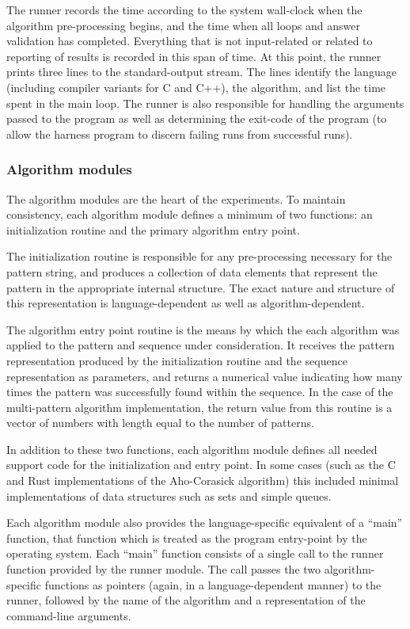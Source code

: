 The runner records the time according to the system wall-clock when the algorithm pre-processing begins, and the time when all loops and answer validation has completed. Everything that is not input-related or related to reporting of results is recorded in this span of time. At this point, the runner prints three lines to the standard-output stream. The lines identify the language (including compiler variants for C and C++), the algorithm, and list the time spent in the main loop. The runner is also responsible for handling the arguments passed to the program as well as determining the exit-code of the program (to allow the harness program to discern failing runs from successful runs).

\subsubsection{Algorithm modules}

The algorithm modules are the heart of the experiments. To maintain consistency, each algorithm module defines a minimum of two functions: an initialization routine and the primary algorithm entry point.

The initialization routine is responsible for any pre-processing necessary for the pattern string, and produces a collection of data elements that represent the pattern in the appropriate internal structure. The exact nature and structure of this representation is language-dependent as well as algorithm-dependent.

The algorithm entry point routine is the means by which the each algorithm was applied to the pattern and sequence under consideration. It receives the pattern representation produced by the initialization routine and the sequence representation as parameters, and returns a numerical value indicating how many times the pattern was successfully found within the sequence. In the case of the multi-pattern algorithm implementation, the return value from this routine is a vector of numbers with length equal to the number of patterns.

In addition to these two functions, each algorithm module defines all needed support code for the initialization and entry point. In some cases (such as the C and Rust implementations of the Aho-Corasick algorithm) this included minimal implementations of data structures such as sets and simple queues.

Each algorithm module also provides the language-specific equivalent of a ``main'' function, that function which is treated as the program entry-point by the operating system. Each ``main'' function consists of a single call to the runner function provided by the runner module. The call passes the two algorithm-specific functions as pointers (again, in a language-dependent manner) to the runner, followed by the name of the algorithm and a representation of the command-line arguments.

